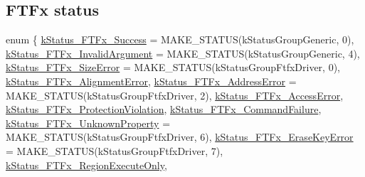 \subsection*{F\+T\+Fx status}
\begin{DoxyCompactItemize}
\item 
enum \{ \newline
\mbox{\hyperlink{group__ftfx__controller_gga458e651af6690959efa2afb96be7d609a8825e5cb3b30edfd6a26897eef4c66a3}{k\+Status\+\_\+\+F\+T\+Fx\+\_\+\+Success}} = M\+A\+K\+E\+\_\+\+S\+T\+A\+T\+US(k\+Status\+Group\+Generic, 0), 
\mbox{\hyperlink{group__ftfx__controller_gga458e651af6690959efa2afb96be7d609a88aadd667559399a26dcb825bf0b8d3e}{k\+Status\+\_\+\+F\+T\+Fx\+\_\+\+Invalid\+Argument}} = M\+A\+K\+E\+\_\+\+S\+T\+A\+T\+US(k\+Status\+Group\+Generic, 4), 
\mbox{\hyperlink{group__ftfx__controller_gga458e651af6690959efa2afb96be7d609a27759c82c0cf2981fe1d4cf05a59e5ff}{k\+Status\+\_\+\+F\+T\+Fx\+\_\+\+Size\+Error}} = M\+A\+K\+E\+\_\+\+S\+T\+A\+T\+US(k\+Status\+Group\+Ftfx\+Driver, 0), 
\mbox{\hyperlink{group__ftfx__controller_gga458e651af6690959efa2afb96be7d609a017490a08a81935f519dcba905b137a4}{k\+Status\+\_\+\+F\+T\+Fx\+\_\+\+Alignment\+Error}}, 
\newline
\mbox{\hyperlink{group__ftfx__controller_gga458e651af6690959efa2afb96be7d609a9297c38b4fd5b80aacc3bc959d8b7b44}{k\+Status\+\_\+\+F\+T\+Fx\+\_\+\+Address\+Error}} = M\+A\+K\+E\+\_\+\+S\+T\+A\+T\+US(k\+Status\+Group\+Ftfx\+Driver, 2), 
\mbox{\hyperlink{group__ftfx__controller_gga458e651af6690959efa2afb96be7d609ae26ada87abb4bec029396e7d4054511e}{k\+Status\+\_\+\+F\+T\+Fx\+\_\+\+Access\+Error}}, 
\mbox{\hyperlink{group__ftfx__controller_gga458e651af6690959efa2afb96be7d609adcde6ccf0be4b041ca26474cbaa90193}{k\+Status\+\_\+\+F\+T\+Fx\+\_\+\+Protection\+Violation}}, 
\mbox{\hyperlink{group__ftfx__controller_gga458e651af6690959efa2afb96be7d609a2da6d194fd8487946c139a4f481cefe2}{k\+Status\+\_\+\+F\+T\+Fx\+\_\+\+Command\+Failure}}, 
\newline
\mbox{\hyperlink{group__ftfx__controller_gga458e651af6690959efa2afb96be7d609a380d2e76caf0ee5493c7a599426ab73c}{k\+Status\+\_\+\+F\+T\+Fx\+\_\+\+Unknown\+Property}} = M\+A\+K\+E\+\_\+\+S\+T\+A\+T\+US(k\+Status\+Group\+Ftfx\+Driver, 6), 
\mbox{\hyperlink{group__ftfx__controller_gga458e651af6690959efa2afb96be7d609a6db9a6a03c0f698988b183effb857c40}{k\+Status\+\_\+\+F\+T\+Fx\+\_\+\+Erase\+Key\+Error}} = M\+A\+K\+E\+\_\+\+S\+T\+A\+T\+US(k\+Status\+Group\+Ftfx\+Driver, 7), 
\mbox{\hyperlink{group__ftfx__controller_gga458e651af6690959efa2afb96be7d609a09024f88aa6607c3383a98171857de47}{k\+Status\+\_\+\+F\+T\+Fx\+\_\+\+Region\+Execute\+Only}}, 

\end{DoxyCompactItemize}
